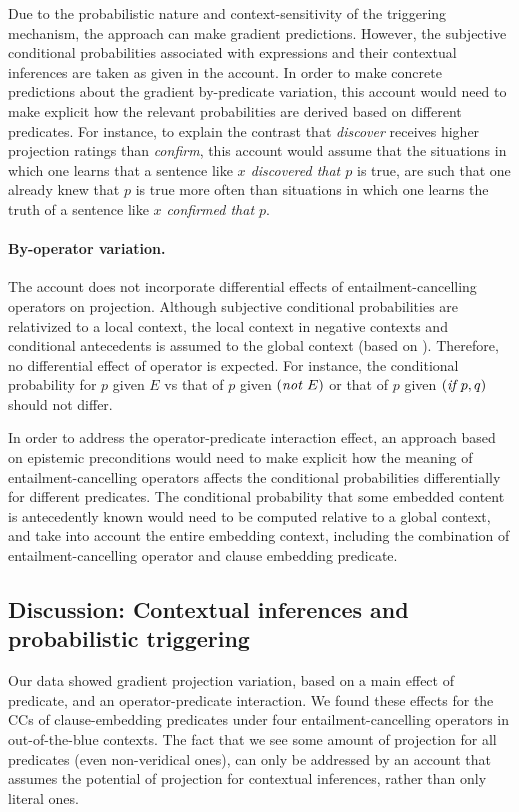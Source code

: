 \documentclass[a4paper,12pt,twoside]{article}
\begin{document}
			Due to the probabilistic nature and context-sensitivity of the triggering mechanism, the approach can make gradient predictions. However, the subjective conditional probabilities associated with expressions and their contextual inferences are taken as given in the account. In order to make concrete predictions about the gradient by-predicate variation, this account would need to make explicit how the relevant probabilities are derived based on different predicates. For instance, to explain the contrast that \emph{discover} receives higher projection ratings than \emph{confirm}, this account would assume that the situations in which one learns that a sentence like \emph{$x$ discovered that $p$} is true, are such that one already knew that $p$ is true more often than situations in which one learns the truth of a sentence like \emph{$x$ confirmed that $p$}.

			\paragraph{By-operator variation.} The account does not incorporate differential effects of entailment-cancelling operators on projection. Although subjective conditional probabilities are relativized to a local context, the local context in negative contexts and conditional antecedents is assumed to the global context (based on \citealt{heim_projection_1983,schlenker_local_2009}). Therefore, no differential effect of operator is expected. For instance, the conditional probability for $p$ given $E$ vs that of $p$ given $(\emph{not } E)$ or that of $p$ given $(\emph{if } p, q)$ should not differ.

			In order to address the operator-predicate interaction effect, an approach based on epistemic preconditions would need to make explicit how the meaning of entailment-cancelling operators affects the conditional probabilities differentially for different predicates.
			The conditional probability that some embedded content is antecedently known would need to be computed relative to a global context, and take into account the entire embedding context, including the combination of entailment-cancelling operator and clause embedding predicate.

	\subsection{Discussion: Contextual inferences and probabilistic triggering}

		Our data showed gradient projection variation, based on a main effect of predicate, and an operator-predicate interaction. We found these effects for the CCs of clause-embedding predicates under four entailment-cancelling operators in out-of-the-blue contexts. The fact that we see some amount of projection for all predicates (even non-veridical ones), can only be addressed by an account that assumes the potential of projection for contextual inferences, rather than only literal ones.
\end{document}
